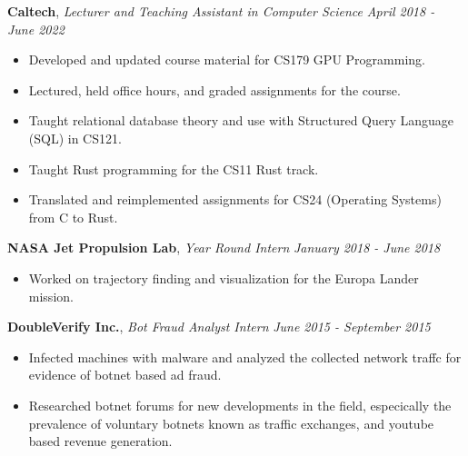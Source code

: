 \documentclass[9pt]{article}
\newenvironment{changemargin}[2]{%
  \begin{list}{}{%
    \setlength{\topsep}{0pt}%
    \setlength{\leftmargin}{#1}%
    \setlength{\rightmargin}{#2}%
    \setlength{\listparindent}{\parindent}%
    \setlength{\itemindent}{\parindent}%
    \setlength{\parsep}{\parskip}%
  }%
  \item[]}{\end{list}
}
\newenvironment{body} {
	\vspace*{-16pt}
	\begin{changemargin}{-0.25in}{-0.5in}
  }	
	{\end{changemargin}
}
\begin{document}
\begin{body}
	\textbf{Caltech}, \emph{Lecturer and Teaching Assistant in Computer Science} \hfill \emph{April 2018 - June 2022}\\
	\vspace*{-3pt}
	\begin{itemize} \itemsep -0pt %
		\item Developed and updated course material for CS179 GPU Programming.
		\item Lectured, held office hours, and graded assignments for the course.
		\item Taught relational database theory and use with Structured Query Language
		      (SQL) in CS121.
		\item Taught Rust programming for the CS11 Rust track.
		\item Translated and reimplemented assignments for CS24 (Operating
		Systems) from C to Rust.
	\end{itemize}
	\vspace*{-2pt}

	\textbf{NASA Jet Propulsion Lab}, \emph{Year Round Intern} \hfill \emph{January 2018 - June 2018}\\
	\vspace*{-3pt}
	\begin{itemize} \itemsep -0pt %
		\item Worked on trajectory finding and visualization for the Europa Lander mission.
	\end{itemize}
	\vspace*{-2pt}

	\textbf{DoubleVerify Inc.}, \emph{Bot Fraud Analyst Intern} \hfill \emph{June 2015 - September 2015}\\
	\vspace*{-3pt}
	\begin{itemize} \itemsep -0pt %
		\item Infected machines with malware and analyzed the collected network traffc for evidence of botnet based ad fraud.
		\item Researched botnet forums for new developments in the field, especically the prevalence of voluntary botnets known as traffic exchanges, and youtube based revenue generation.
	\end{itemize}
	\vspace*{-2pt}


\end{body}
\end{document}
